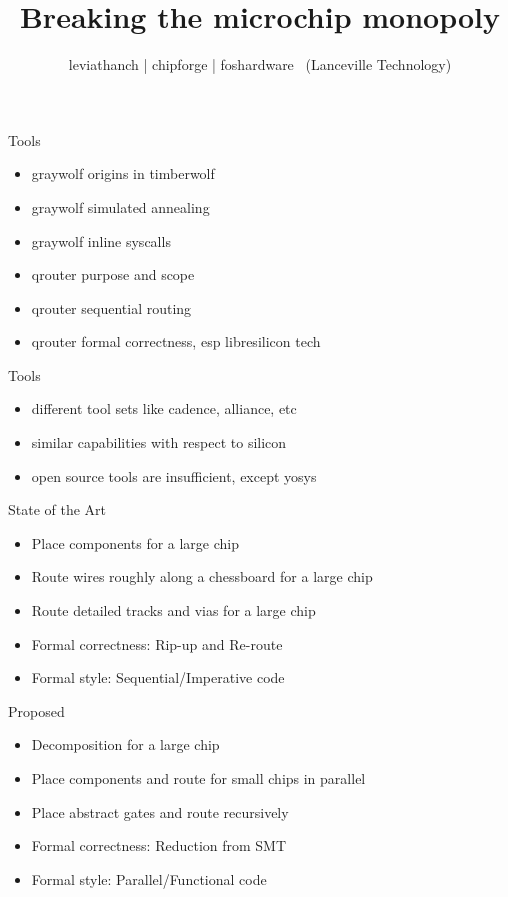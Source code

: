 \documentclass[9pt]{beamer}
\author{leviathanch | chipforge | foshardware \ (Lanceville Technology)}
\title{Breaking the microchip monopoly}
\begin{document}

\section[Place'n'Route]{}

\begin{frame}{Tools}
	\begin{itemize}
        \setlength\itemsep{1em}
		\item graywolf origins in timberwolf
		\item graywolf simulated annealing
		\item graywolf inline syscalls
		\item qrouter purpose and scope
		\item qrouter sequential routing
		\item qrouter formal correctness, esp libresilicon tech
	\end{itemize}
\end{frame}

\begin{frame}{Tools}
	\begin{itemize}
        \setlength\itemsep{1em}
		\item different tool sets like cadence, alliance, etc
		\item similar capabilities with respect to silicon
		\item open source tools are insufficient, except yosys
	\end{itemize}
\end{frame}

\begin{frame}{State of the Art}
	\begin{itemize}
        \setlength\itemsep{1em}
		\item Place components for a large chip
		\item Route wires roughly along a chessboard for a large chip
		\item Route detailed tracks and vias for a large chip
		\item Formal correctness: Rip-up and Re-route
		\item Formal style: Sequential/Imperative code
	\end{itemize}
\end{frame}

\begin{frame}{Proposed}
	\begin{itemize}
        \setlength\itemsep{1em}
		\item Decomposition for a large chip
		\item Place components and route for small chips in parallel
		\item Place abstract gates and route recursively
		\item Formal correctness: Reduction from SMT
		\item Formal style: Parallel/Functional code
	\end{itemize}
\end{frame}
\end{document}
